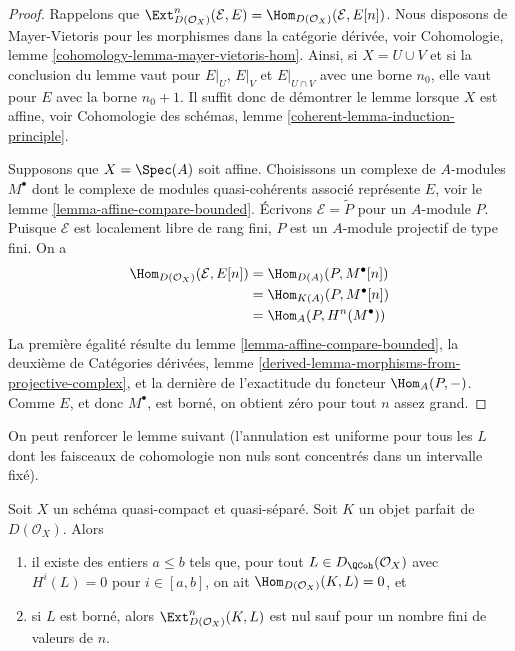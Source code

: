 \begin{proof}
Rappelons que $\Ext^n_{D(\mathcal{O}_X)}(\mathcal{E}, E) =
\Hom_{D(\mathcal{O}_X)}(\mathcal{E}, E[n])$. Nous disposons de
Mayer-Vietoris pour les morphismes dans la catégorie dérivée, voir
Cohomologie, lemme \ref{cohomology-lemma-mayer-vietoris-hom}.
Ainsi, si $X = U \cup V$ et si la conclusion du lemme vaut
pour $E|_U$, $E|_V$ et $E|_{U \cap V}$ avec une borne $n_0$,
elle vaut pour $E$ avec la borne $n_0 + 1$.
Il suffit donc de démontrer le lemme lorsque $X$ est affine, voir
Cohomologie des schémas, lemme \ref{coherent-lemma-induction-principle}.

\medskip\noindent
Supposons que $X = \Spec(A)$ soit affine. Choisissons un complexe de $A$-modules
$M^\bullet$ dont le complexe de modules quasi-cohérents associé
représente $E$, voir le lemme \ref{lemma-affine-compare-bounded}.
Écrivons $\mathcal{E} = \widetilde{P}$ pour un $A$-module $P$.
Puisque $\mathcal{E}$ est localement libre de rang fini, $P$
est un $A$-module projectif de type fini. On a
\begin{align*}
\Hom_{D(\mathcal{O}_X)}(\mathcal{E}, E[n])
& = 
\Hom_{D(A)}(P, M^\bullet[n]) \\
& =
\Hom_{K(A)}(P, M^\bullet[n]) \\
& =
\Hom_A(P, H^n(M^\bullet))
\end{align*}
La première égalité résulte du lemme \ref{lemma-affine-compare-bounded},
la deuxième de
Catégories dérivées, lemme
\ref{derived-lemma-morphisms-from-projective-complex}, et
la dernière de l'exactitude du foncteur $\Hom_A(P, -)$.
Comme $E$, et donc $M^\bullet$, est borné,
on obtient zéro pour tout $n$ assez grand.
\end{proof}

\noindent
On peut renforcer le lemme suivant (l'annulation est uniforme
pour tous les $L$ dont les faisceaux de cohomologie non nuls
sont concentrés dans un intervalle fixé).

\begin{lemma}
\label{lemma-ext-from-perfect-into-bounded-QCoh}
Soit $X$ un schéma quasi-compact et quasi-séparé.
Soit $K$ un objet parfait de $D(\mathcal{O}_X)$. Alors
\begin{enumerate}
\item il existe des entiers $a \leq b$ tels que, pour tout
$L \in D_\QCoh(\mathcal{O}_X)$ avec $H^i(L) = 0$ pour $i \in [a, b]$,
on ait $\Hom_{D(\mathcal{O}_X)}(K, L) = 0$, et
\item si $L$ est borné, alors $\Ext^n_{D(\mathcal{O}_X)}(K, L)$
est nul sauf pour un nombre fini de valeurs de $n$.
\end{enumerate}
\end{lemma}


